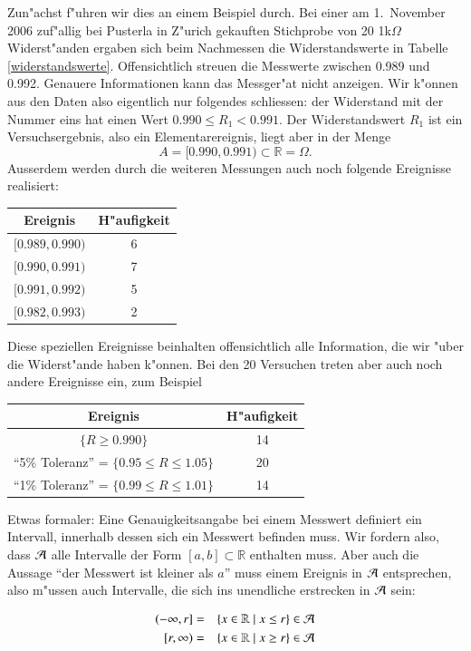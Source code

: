 Zun"achst f"uhren wir dies an einem Beispiel durch.
Bei einer am 1.~November 2006
zuf"allig bei Pusterla in Z"urich gekauften Stichprobe von 20 1k$\Omega$
Widerst"anden ergaben sich beim Nachmessen die Widerstandswerte in 
Tabelle \ref{widerstandswerte}. Offensichtlich streuen die Messwerte
zwischen 0.989 und 0.992. Genauere Informationen kann das Messger"at nicht
anzeigen. Wir k"onnen aus den Daten also eigentlich nur folgendes schliessen:
der Widerstand mit der Nummer eins hat einen Wert $0.990\le R_1<0.991$.
Der Widerstandswert $R_1$ ist ein Versuchsergebnis, also ein Elementarereignis,
liegt aber in der Menge
\[
A=[0.990,0.991)\subset \mathbb{R}=\Omega.
\]
Ausserdem werden durch die weiteren Messungen auch noch folgende
Ereignisse realisiert:
\begin{center}
\begin{tabular}{|c|c|}
\hline
Ereignis&H"aufigkeit\\
\hline
$[0.989,0.990)$&6\\
$[0.990,0.991)$&7\\
$[0.991,0.992)$&5\\
$[0.982,0.993)$&2\\
\hline
\end{tabular}
\end{center}
Diese speziellen Ereignisse beinhalten offensichtlich alle Information,
die wir "uber die Widerst"ande haben k"onnen.
Bei den 20 Versuchen treten aber auch noch andere Ereignisse ein,
zum Beispiel
\begin{center}
\begin{tabular}{|c|c|}
\hline
Ereignis&H"aufigkeit\\
\hline
$\{R\ge 0.990\}$&14\\
``5\% Toleranz'' = $\{0.95\le R\le1.05\}$&20\\
``1\% Toleranz'' = $\{0.99\le R\le 1.01\}$&14\\
\hline
\end{tabular}
\end{center}

Etwas formaler: Eine Genauigkeitsangabe bei einem Messwert definiert
ein Intervall, innerhalb dessen sich ein Messwert befinden muss. Wir
fordern also, dass $\cal A$ alle Intervalle der Form $[a,b]\subset\mathbb R$
enthalten muss. Aber auch die Aussage ``der Messwert ist kleiner als $a$''
muss einem Ereignis in $\cal A$ entsprechen, also m"ussen auch Intervalle,
die sich ins unendliche erstrecken in $\cal A$ sein:

\begin{eqnarray*}{}
(-\infty,r]&=&\{x\in\mathbb R\;|\;x \le r\} \in \cal A\\
\;[r,\infty)&=&\{x\in\mathbb R\;|\;x \ge r\} \in \cal A\\
\end{eqnarray*}

